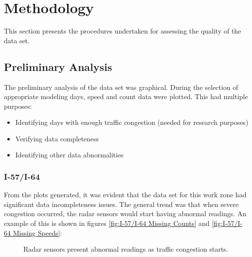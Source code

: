 \documentclass[11pt]{article}
\begin{document}
\section{Methodology}
This section presents the procedures undertaken for assessing the quality of the data set.

\subsection{Preliminary Analysis}
The preliminary analysis of the data set was graphical. During the selection of appropriate modeling days, speed and count data were plotted. This had multiple purposes:
\begin{itemize}
	\item Identifying days with enough traffic congestion (needed for research purposes)
	\item Verifying data completeness
	\item Identifying other data abnormalities
\end{itemize}

\subsubsection{I-57/I-64}
From the plots generated, it was evident that the data set for this work zone had significant data incompleteness issues. The general trend was that when severe congestion occurred, the radar sensors would start having abnormal readings. An example of this is shown in figures \ref{fig:I-57/I-64 Missing Counts} and \ref{fig:I-57/I-64 Missing Speeds}:

\begin{figure}[H]
  \centering
  \hfill
  \caption{Radar sensors present abnormal readings as traffic congestion starts.}
\end{figure}
\end{document}
